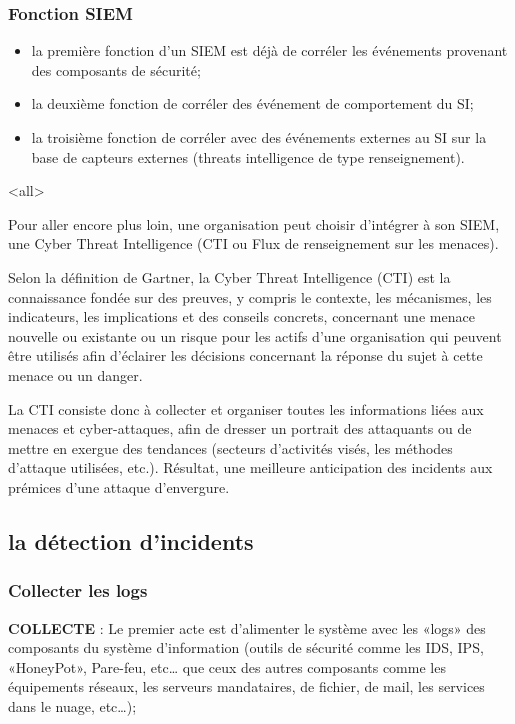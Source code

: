 \begin{frame}
\frametitle<presentation>{Fonction SIEM}
\begin{itemize}
  \item la première fonction d'un SIEM est déjà de corréler les événements provenant des composants de sécurité;
  \item la deuxième  fonction de corréler des événement de comportement du SI;
  \item la troisième fonction de corréler avec des événements externes au SI sur la base de capteurs externes (threats intelligence de type renseignement).
\end{itemize}
\end{frame}


\mode<all>{}

Pour aller encore plus loin, une organisation peut choisir d’intégrer à son SIEM,  une Cyber Threat Intelligence (CTI ou Flux de renseignement sur les menaces). 

Selon la définition de Gartner, la Cyber Threat Intelligence (CTI) est la connaissance fondée sur des preuves, y compris le contexte, les mécanismes, les indicateurs, les implications et des conseils concrets, concernant une menace nouvelle ou existante ou un risque pour les actifs d’une organisation qui peuvent être utilisés afin d’éclairer les décisions concernant la réponse du sujet à cette menace ou un danger.

La CTI consiste donc à collecter et organiser toutes les informations liées aux menaces et cyber-attaques, afin de dresser un portrait des attaquants ou de mettre en exergue des tendances (secteurs d’activités visés, les méthodes d’attaque utilisées, etc.). Résultat, une meilleure anticipation des incidents aux prémices d’une attaque d’envergure.

 \subsection{la détection d'incidents}

\subsubsection {Collecter les logs }
\textbf{COLLECTE}  : Le premier acte est d'alimenter le système avec les «logs» des composants du système d’information (outils de sécurité comme les IDS, IPS, «HoneyPot», Pare-feu, etc… que ceux des autres composants comme les équipements réseaux, les serveurs mandataires, de fichier, de mail, les services dans le nuage, etc…);
